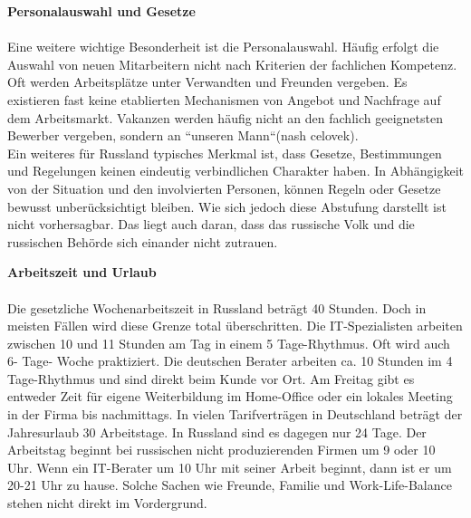 	\textbf{Personalauswahl und Gesetze}\\
	\\
	 Eine weitere wichtige Besonderheit ist die Personalauswahl. Häufig erfolgt die Auswahl von neuen 
	 Mitarbeitern nicht nach Kriterien der fachlichen Kompetenz. Oft werden Arbeitsplätze unter Verwandten und 
	 Freunden vergeben. Es existieren fast keine etablierten Mechanismen von Angebot und Nachfrage auf dem 
	 Arbeitsmarkt. Vakanzen werden häufig nicht an den fachlich geeignetsten Bewerber vergeben, sondern an 
	 ``unseren Mann``(nash celovek).\\
	 Ein weiteres für Russland typisches Merkmal ist, dass Gesetze, Bestimmungen und 
	 Regelungen keinen eindeutig verbindlichen Charakter haben. In Abhängigkeit von der 
	 Situation und den involvierten Personen, können Regeln oder Gesetze bewusst 
	 unberücksichtigt bleiben. Wie sich jedoch diese Abstufung darstellt ist nicht vorhersagbar. Das liegt auch daran, dass das russische Volk und die russischen Behörde sich einander nicht zutrauen.
	 
	 \textbf{Arbeitszeit und Urlaub}\\
	 \\
	 Die gesetzliche Wochenarbeitszeit in Russland beträgt 40 Stunden. Doch in meisten Fällen wird diese Grenze total überschritten. Die IT-Spezialisten arbeiten zwischen 10 und 11 Stunden am Tag in einem 5 Tage-Rhythmus.%
	  Oft wird auch 6- Tage- Woche praktiziert. Die deutschen Berater arbeiten ca. 10 Stunden  im 4 Tage-Rhythmus und sind direkt beim Kunde vor Ort. Am Freitag gibt es entweder Zeit für eigene Weiterbildung im Home-Office oder ein lokales Meeting in der Firma bis nachmittags.
	 In vielen Tarifverträgen in Deutschland beträgt der Jahresurlaub 30 Arbeitstage. In Russland sind es dagegen nur 24 Tage. Der Arbeitstag beginnt bei russischen nicht produzierenden Firmen um 9 oder 10 Uhr. Wenn ein IT-Berater um 10 Uhr mit seiner Arbeit beginnt, dann ist er um 20-21 Uhr zu hause. Solche Sachen wie Freunde, Familie und Work-Life-Balance stehen nicht direkt im Vordergrund.  %
	 \\
	 
